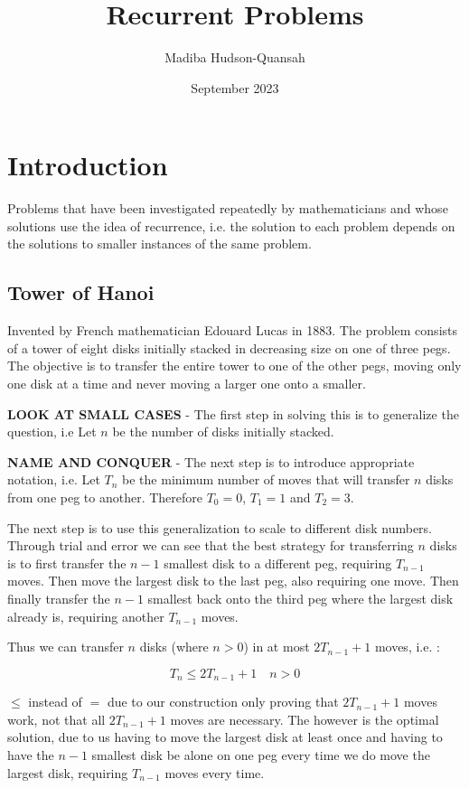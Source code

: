 \documentclass[12pt letter]{report}
\title{\Huge{Recurrent Problems}}
\author{\huge{Madiba Hudson-Quansah}}
\date{September 2023}
\begin{document}
\maketitle
\newpage
{}
\tableofcontents
\pagebreak

\chapter{Introduction}

Problems that have been investigated repeatedly by mathematicians and whose solutions use the idea of recurrence, i.e.
the solution to each problem depends on the solutions to smaller instances of the same problem.

\section{Tower of Hanoi}

Invented by French mathematician Edouard Lucas in 1883. The problem consists of a tower of eight disks initially stacked
in decreasing size on one of three pegs.
The objective is to transfer the entire tower to one of the other pegs, moving only one disk at a time and never moving
a larger one onto a smaller.

\textbf{LOOK AT SMALL CASES} - The first step in solving this is to generalize the question, i.e Let $n$ be the number of disks initially stacked.

\textbf{NAME AND CONQUER} - The next step is to introduce appropriate notation, i.e. Let $T_n$ be the minimum number of moves that will transfer $n$
disks from one peg to another. Therefore $T_0 = 0$, $T_1= 1$ and $T_2 = 3$.

The next step is to use this generalization to scale to different disk numbers. Through trial and error we can see that
the best strategy for transferring $n$ disks is to first transfer the $n - 1$ smallest disk to a different peg, requiring
$T_{n-1}$ moves. Then move the largest disk to the last peg, also requiring one move. Then finally transfer the $n-1$
smallest back onto the third peg where the largest disk already is, requiring another $T_{n-1}$ moves.

Thus we can transfer $n$ disks (where $n > 0$) in at most $2T_{n-1} + 1$ moves, i.e. :

\[
	T_n \leq 2T_{n-1} + 1 \quad n > 0
\]

$\leq$ instead of $=$ due to our construction only proving that $2T_{n-1} + 1$ moves work, not that all $2T_{n-1} + 1$
moves are necessary. The however is the optimal solution, due to us having to move the largest disk at least once and
having to have the $n-1$ smallest disk be alone on one peg every time we do move the largest disk, requiring $T_{n-1}$
moves every time.
\end{document}
